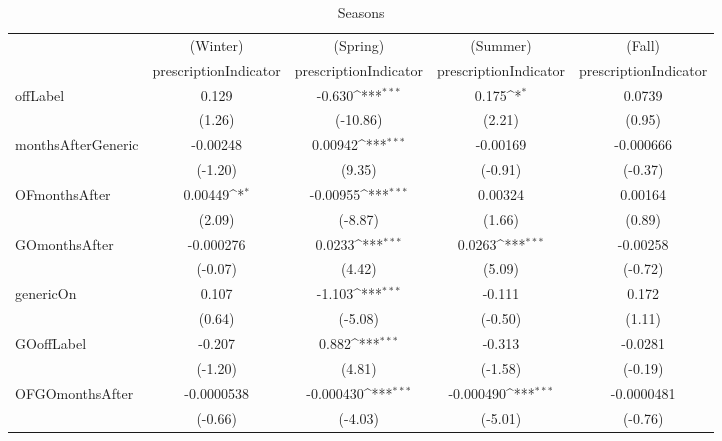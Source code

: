 \begin{table}[htbp]\centering
\def\sym#1{\ifmmode^{#1}\else\(^{#1}\)\fi}
\caption{Seasons\label{tab1}}
\begin{tabular}{l*{4}{c}}
\hline\hline
            &\multicolumn{1}{c}{(Winter)}&\multicolumn{1}{c}{(Spring)}&\multicolumn{1}{c}{(Summer)}&\multicolumn{1}{c}{(Fall)}\\
            &\multicolumn{1}{c}{prescriptionIndicator}&\multicolumn{1}{c}{prescriptionIndicator}&\multicolumn{1}{c}{prescriptionIndicator}&\multicolumn{1}{c}{prescriptionIndicator}\\
\hline
offLabel    &       0.129         &      -0.630\sym{***}&       0.175\sym{*}  &      0.0739         \\
            &      (1.26)         &    (-10.86)         &      (2.21)         &      (0.95)         \\
[1em]
monthsAfterGeneric&    -0.00248         &     0.00942\sym{***}&    -0.00169         &   -0.000666         \\
            &     (-1.20)         &      (9.35)         &     (-0.91)         &     (-0.37)         \\
[1em]
OFmonthsAfter&     0.00449\sym{*}  &    -0.00955\sym{***}&     0.00324         &     0.00164         \\
            &      (2.09)         &     (-8.87)         &      (1.66)         &      (0.89)         \\
[1em]
GOmonthsAfter&   -0.000276         &      0.0233\sym{***}&      0.0263\sym{***}&    -0.00258         \\
            &     (-0.07)         &      (4.42)         &      (5.09)         &     (-0.72)         \\
[1em]
genericOn   &       0.107         &      -1.103\sym{***}&      -0.111         &       0.172         \\
            &      (0.64)         &     (-5.08)         &     (-0.50)         &      (1.11)         \\
[1em]
GOoffLabel  &      -0.207         &       0.882\sym{***}&      -0.313         &     -0.0281         \\
            &     (-1.20)         &      (4.81)         &     (-1.58)         &     (-0.19)         \\
[1em]
OFGOmonthsAfter&  -0.0000538         &   -0.000430\sym{***}&   -0.000490\sym{***}&  -0.0000481         \\
            &     (-0.66)         &     (-4.03)         &     (-5.01)         &     (-0.76)         \\

\end{tabular}
\end{table}
